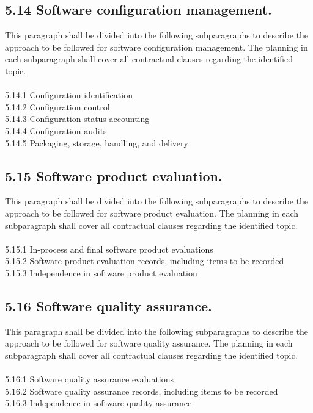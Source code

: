 \subsection{5.14 Software configuration management.}

This paragraph shall be divided into the following subparagraphs to
describe the approach to be followed for software configuration
management. The planning in each subparagraph shall cover all
contractual clauses regarding the identified topic. \\\\ 5.14.1
Configuration identification \\ 5.14.2 Configuration control \\ 5.14.3
Configuration status accounting \\ 5.14.4 Configuration audits \\ 5.14.5
Packaging, storage, handling, and delivery

\subsection{5.15 Software product evaluation.}

This paragraph shall be divided into the following subparagraphs to
describe the approach to be followed for software product evaluation.
The planning in each subparagraph shall cover all contractual clauses
regarding the identified topic. \\\\ 5.15.1 In-process and final
software product evaluations \\ 5.15.2 Software product evaluation
records, including items to be recorded \\ 5.15.3 Independence in
software product evaluation

\subsection{5.16 Software quality assurance.}

This paragraph shall be divided into the following subparagraphs to
describe the approach to be followed for software quality assurance. The
planning in each subparagraph shall cover all contractual clauses
regarding the identified topic. \\\\ 5.16.1 Software quality assurance
evaluations \\ 5.16.2 Software quality assurance records, including
items to be recorded \\ 5.16.3 Independence in software quality
assurance


